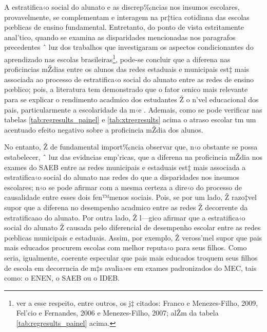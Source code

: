 \documentclass[a4paper, 12pt]{article}
\begin{document}
A estratifica‹o social do alunato e as discrep‰ncias nos insumos escolares, provavelmente, se complementam e interagem na pr‡tica cotidiana das escolas pœblicas de ensino fundamental. Entretanto, do ponto de vista estritamente anal’tico, quando se examina as disparidades mencionadas nos paragrafos precedentes ˆ luz dos trabalhos que investigaram os aspectos condicionantes do aprendizado nas escolas brasileiras\footnote{ver a esse respeito, entre outros, os j‡ citados: Franco e Menezes-Filho, 2009, Fel’cio e Fernandes, 2006 e Menezes-Filho, 2007; alŽm da tabela \ref{tab:regresults_painel} acima.}, pode-se concluir que a diferena nas proficincias mŽdias entre os alunos das redes estaduais e municipais est‡ mais associada ao processo de estratifica‹o social do alunato entre as redes de ensino pœblico; pois, a literatura tem demonstrado que o fator œnico mais relevante para se explicar o rendimento acadmico dos estudantes Ž o n’vel educacional dos pais, particularmente a escolaridade da m‹e \cite{glewwe_chapter_2006}. Ademais, como se pode verificar nas tabelas \ref{tab:regresults_painel} e \ref{tab:xtregresults} acima o atraso escolar tm um acentuado efeito negativo sobre a proficincia mŽdia dos alunos.

No entanto, Ž de fundamental import‰ncia observar que, n‹o obstante se possa estabelecer, ˆ luz das evidncias emp’ricas, que a diferena na proficincia mŽdia nos exames do SAEB entre as redes municipais e estaduais est‡ mais associada a estratifica‹o social do alunato nas redes do que a disparidades nos insumos escolares; n‹o se pode afirmar com a mesma certeza a dire‹o do processo de causalidade entre esses dois fen™menos sociais. Pois, se por um lado, Ž razo‡vel supor que a diferena no desempenho acadmico entre as redes Ž decorrente da estratificaao do alunato. Por outra lado, Ž l—gico afirmar que a estratifica‹o social do alunato Ž causada pelo diferencial de desempenho escolar entre as redes pœblicas municipais e estaduais. Assim, por exemplo, Ž veross’mel supor que pais mais educados procurem escolas com melhor reputa‹o para seus filhos. Como seria, igualmente, coerente especular que pais mais educados troquem seus filhos de escola em decorrncia de m‡s avalia›es em exames padronizados do MEC, tais como: o ENEN, o SAEB ou o IDEB. 
\end{document}
